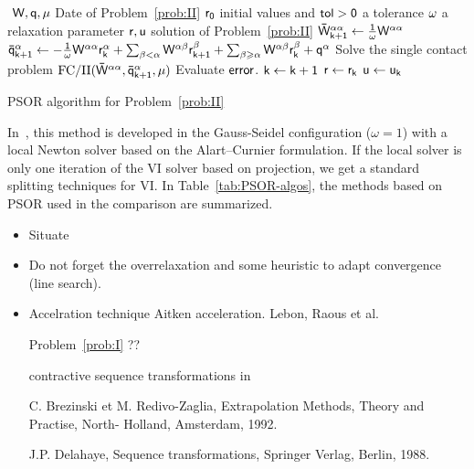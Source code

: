 \begin{algorithm}
  \begin{algorithmic}
    {\sf
      \STATE $ $ 
      \REQUIRE $\sf W,q,\mu $ Date of Problem~\ref{prob:II} 
      \REQUIRE $\sf r_0$ initial values and $\sf tol >0$ a tolerance
      \REQUIRE $\sf \omega$ a relaxation parameter 
      \ENSURE  $\sf r,u$ solution of Problem~\ref{prob:II}
      \STATE $\sf \bar W^{\alpha\alpha}_{k+1} \leftarrow  \frac 1 \omega W^{\alpha\alpha}$
      \STATE $\sf   \bar q^{\alpha}_{k+1} \leftarrow - \frac 1 \omega W^{\alpha\alpha} r^{\alpha}_{k}
      + \sum_{\beta < \alpha}W^{\alpha\beta} r^{\beta}_{k+1} + \sum_{\beta
        \geq \alpha}W^{\alpha\beta} r^{\beta}_{k} + q^\alpha $
      \STATE Solve the single contact problem $\sf \mathrm{FC/II}(\bar W^{\alpha\alpha},\bar q^{\alpha}_{k+1},\mu)$
      \ENDFOR
      \STATE Evaluate $\sf error$.
      \STATE $\sf k \leftarrow k+1$ 
      \ENDWHILE
      \STATE $\sf r \leftarrow r_{k}$ 
      \STATE $\sf u \leftarrow u_{k}$ 
    }
  \end{algorithmic}
  \caption{PSOR algorithm for Problem~\ref{prob:II}}  \label{Algo:PSOR-II}
\end{algorithm}

In~\cite{Jourdan.Alart.ea98}, this method is developed in the Gauss-Seidel configuration ($\omega=1$) with a local Newton solver based on the Alart--Curnier formulation. If the local solver is only one iteration of the VI solver based on projection, we get a standard splitting techniques for VI. In Table~\ref{tab:PSOR-algos}, the methods based on PSOR used in the comparison are summarized.

\begin{ndrva}
  \begin{itemize}
  \item Situate \cite{Hayashi.ea_JCAM2005}
  \item Do not forget the overrelaxation and some heuristic to adapt convergence (line search).
  \item Accelration technique
    Aitken acceleration. Lebon, Raous et al.
    
    Problem~\ref{prob:I} ??
    
    contractive sequence transformations in 
    
    C. Brezinski et M. Redivo-Zaglia, Extrapolation Methods, Theory and Practise, North- Holland, Amsterdam, 1992.
    
    J.P. Delahaye, Sequence transformations, Springer Verlag, Berlin, 1988.
  \end{itemize}
\end{ndrva}




